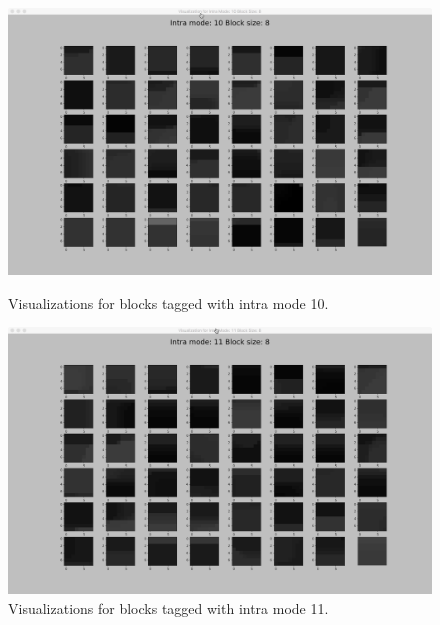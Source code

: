     \begin{figure}
    
        \vspace*{1cm} %
    
        \begin{minipage}{0.49\textwidth}
            \includegraphics[width=\linewidth]{Figures/visu-size8x8/8-10}
            \caption[Visualizations for blocks tagged with intra mode 10]{Visualizations for blocks tagged with intra mode 10.}
            \label{fig:size8_mode4}
        \end{minipage}
        \hspace{\fill} %
        \begin{minipage}{0.49\textwidth}
            \includegraphics[width=\linewidth]{Figures/visu-size8x8/8-11}
            \caption[Visualizations for blocks tagged with intra mode 11]{Visualizations for blocks tagged with intra mode 11.}
            \label{fig:size8_mode11}
        \end{minipage}
        

\end{figure}
